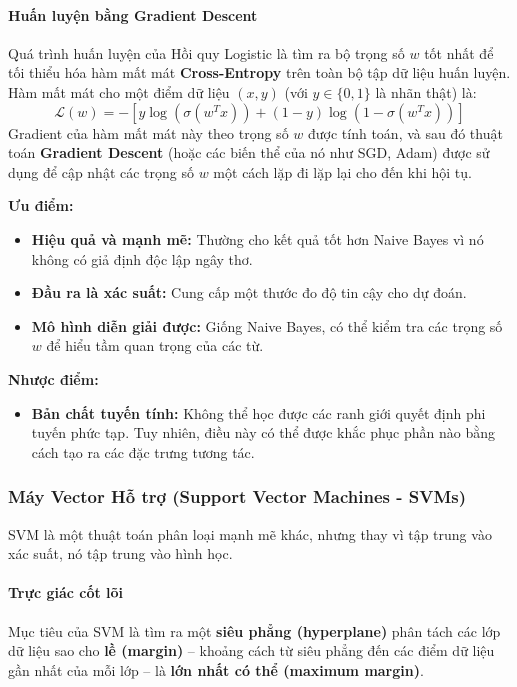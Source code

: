 \paragraph{Huấn luyện bằng Gradient Descent}
Quá trình huấn luyện của Hồi quy Logistic là tìm ra bộ trọng số $w$ tốt nhất để tối thiểu hóa hàm mất mát \textbf{Cross-Entropy} trên toàn bộ tập dữ liệu huấn luyện. Hàm mất mát cho một điểm dữ liệu $(x, y)$ (với $y \in \{0, 1\}$ là nhãn thật) là:
$$ \mathcal{L}(w) = -[y \log(\sigma(w^T x)) + (1-y) \log(1 - \sigma(w^T x))] $$
Gradient của hàm mất mát này theo trọng số $w$ được tính toán, và sau đó thuật toán \textbf{Gradient Descent} (hoặc các biến thể của nó như SGD, Adam) được sử dụng để cập nhật các trọng số $w$ một cách lặp đi lặp lại cho đến khi hội tụ.

\begin{tcolorbox}[
    title=Đánh giá Hồi quy Logistic,
    colback=blue!5!white, colframe=blue!50!black, fonttitle=\bfseries
]
\textbf{Ưu điểm:}
\begin{itemize}
    \item \textbf{Hiệu quả và mạnh mẽ:} Thường cho kết quả tốt hơn Naive Bayes vì nó không có giả định độc lập ngây thơ.
    \item \textbf{Đầu ra là xác suất:} Cung cấp một thước đo độ tin cậy cho dự đoán.
    \item \textbf{Mô hình diễn giải được:} Giống Naive Bayes, có thể kiểm tra các trọng số $w$ để hiểu tầm quan trọng của các từ.
\end{itemize}
\textbf{Nhược điểm:}
\begin{itemize}
    \item \textbf{Bản chất tuyến tính:} Không thể học được các ranh giới quyết định phi tuyến phức tạp. Tuy nhiên, điều này có thể được khắc phục phần nào bằng cách tạo ra các đặc trưng tương tác.
\end{itemize}
\end{tcolorbox}

\subsubsection{Máy Vector Hỗ trợ (Support Vector Machines - SVMs)}
SVM \cite{cortes1995support} là một thuật toán phân loại mạnh mẽ khác, nhưng thay vì tập trung vào xác suất, nó tập trung vào hình học.

\paragraph{Trực giác cốt lõi}
Mục tiêu của SVM là tìm ra một \textbf{siêu phẳng (hyperplane)} phân tách các lớp dữ liệu sao cho \textbf{lề (margin)} -- khoảng cách từ siêu phẳng đến các điểm dữ liệu gần nhất của mỗi lớp -- là \textbf{lớn nhất có thể (maximum margin)}.

